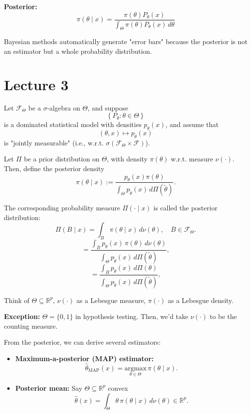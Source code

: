 \documentclass[open=any, 11pt,paper=A4]{scrreprt}
\begin{document}
\textbf{Posterior:}
\[
    \pi(\theta \mid x) = \frac{\pi(\theta) P_\theta(x)}{\int_{\Theta} \pi(\theta) P_\theta(x) \, d\theta}
\]

\begin{remark}
Bayesian methods automatically generate "error bars" because the posterior is not an estimator but a whole probability distribution.
\end{remark}



\section*{Lecture 3}

\begin{definition}\label{def:prior, posterior, bayes rule}
Let $\mathcal{F}_\Theta$ be a $\sigma$-algebra on $\Theta$, and suppose 
\[
\left\{ P_\theta : \theta \in \Theta \right\}
\]
is a dominated statistical model with densities $p_\theta(x)$, and assume that 
\[
(\theta, x) \mapsto p_\theta(x)
\]
is "jointly measurable" (i.e., w.r.t. $\sigma(\mathcal{F}_\Theta \times \mathcal{F})$).

Let $\Pi$ be a prior distribution on $\Theta$, with density $\pi(\theta)$ w.r.t. measure $\nu(\cdot)$. Then, define the posterior density
\[
\pi(\theta \mid x) := \frac{p_\theta(x) \pi(\theta)}{\int_\Theta p_{\tilde{\theta}}(x) \, d\Pi(\tilde{\theta})}.
\]
\end{definition}

The corresponding probability measure $\Pi(\cdot \mid x)$ is called the posterior distribution:
\[
\Pi(B \mid x) = \int_B \pi(\theta \mid x) \, d\nu(\theta), \quad B \in \mathcal{F}_\Theta.
\]
\[
= \frac{\int_B p_\theta(x) \, \pi(\theta) \, d\nu(\theta)}{\int_\Theta p_{\tilde{\theta}}(x) \, d\Pi(\tilde{\theta})},
\]
\[
= \frac{\int_B p_\theta(x) \, d\Pi(\theta)}{\int_\Theta p_{\tilde{\theta}}(x) \, d\Pi(\tilde{\theta})},
\]

\begin{remark}
Think of $\Theta \subseteq \mathbb{R}^p$, $\nu(\cdot)$ as a Lebesgue measure, $\pi(\cdot)$ as a Lebesgue density.

\textbf{Exception:} $\Theta = \{0,1\}$ in hypothesis testing. Then, we'd take $\nu(\cdot)$ to be the counting measure.
\end{remark}

From the posterior, we can derive several estimators:
\begin{itemize}
    \item \textbf{Maximum-a-posterior (MAP) estimator:}
    \[
    \hat{\theta}_{\text{MAP}}(x) = \underset{\theta \in \Theta}{\text{argmax}} \, \pi(\theta \mid x).
    \]
    \item \textbf{Posterior mean:} Say \( \Theta \subseteq \mathbb{R}^p \) convex
    \[
    \hat{\theta}(x) = \int_\Theta \theta \, \pi(\theta \mid x) \, d\nu(\theta) \in \mathbb{R}^p.
    \]
\end{itemize}
\end{document}
